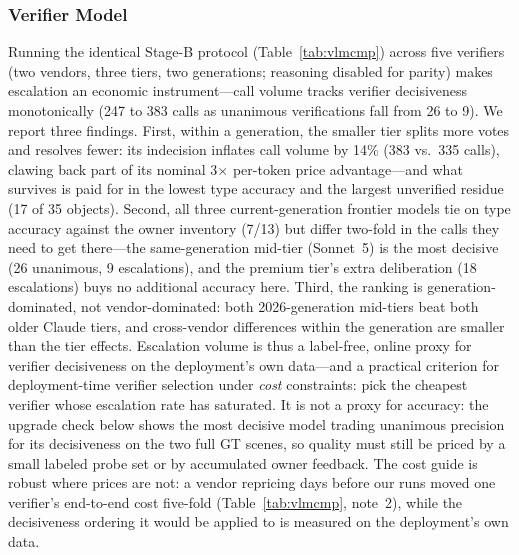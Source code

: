 \documentclass[electronics,article,accept,pdftex,moreauthors]{Definitions/mdpi}
\begin{document}
\subsubsection{Verifier Model}
Running the identical Stage-B protocol (Table~\ref{tab:vlmcmp}) across
five verifiers (two vendors, three tiers, two generations; reasoning
disabled for parity) makes escalation an economic instrument---call
volume tracks verifier decisiveness monotonically (247 to 383 calls as
unanimous verifications fall from 26 to 9). We report three findings. First,
within a generation, the smaller tier splits more votes and resolves
fewer: its indecision inflates call volume by 14\% (383 vs.\ 335
calls), clawing back part of its nominal 3$\times$ per-token price
advantage---and what survives is paid for in the lowest type
accuracy and the largest unverified residue (17 of 35 objects).
Second, all three current-generation
frontier models tie on type accuracy against the owner inventory
(7/13) but differ two-fold in the calls they need to get there---the same-generation mid-tier (Sonnet~5) is the most decisive (26
unanimous, 9 escalations), and the premium tier's extra deliberation
(18 escalations) buys no additional accuracy here. Third, the ranking
is generation-dominated, not vendor-dominated: both 2026-generation
mid-tiers beat both older Claude tiers, and cross-vendor differences
within the generation are smaller than the tier effects. Escalation
volume is thus a label-free, online proxy for verifier decisiveness on
the deployment's own data---and a practical criterion for
deployment-time verifier selection under \emph{cost} constraints:
pick the cheapest verifier whose escalation rate has saturated. It is
not a proxy for accuracy: the upgrade check below shows the most
decisive model trading
unanimous precision for its decisiveness on the two full GT scenes, so
quality must still be priced by a small labeled probe set or by
accumulated owner feedback. The cost guide is robust where prices are
not: a vendor repricing days before our runs moved one verifier's
end-to-end cost five-fold (Table~\ref{tab:vlmcmp}, note~2), while the
decisiveness ordering it would be applied to is measured on the
deployment's own data.
\end{document}
